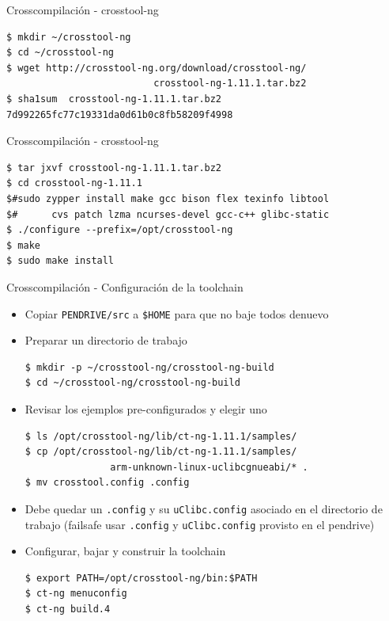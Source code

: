\documentclass[xetex]{beamer}
\begin{document}
\begin{frame}[fragile]{Crosscompilación - crosstool-ng}
\begin{verbatim}
$ mkdir ~/crosstool-ng
$ cd ~/crosstool-ng
$ wget http://crosstool-ng.org/download/crosstool-ng/
                          crosstool-ng-1.11.1.tar.bz2
$ sha1sum  crosstool-ng-1.11.1.tar.bz2 
7d992265fc77c19331da0d61b0c8fb58209f4998 
\end{verbatim}
\end{frame}

\begin{frame}[fragile]{Crosscompilación - crosstool-ng}
\begin{verbatim}
$ tar jxvf crosstool-ng-1.11.1.tar.bz2
$ cd crosstool-ng-1.11.1
$#sudo zypper install make gcc bison flex texinfo libtool
$#      cvs patch lzma ncurses-devel gcc-c++ glibc-static
$ ./configure --prefix=/opt/crosstool-ng
$ make
$ sudo make install
\end{verbatim}
\end{frame}

\begin{frame}[fragile]{Crosscompilación - Configuración de la toolchain}
\begin{itemize}
  \item Copiar \verb=PENDRIVE/src= a \verb=$HOME= para que no baje todos denuevo
  \item Preparar un directorio de trabajo
\begin{verbatim}
$ mkdir -p ~/crosstool-ng/crosstool-ng-build
$ cd ~/crosstool-ng/crosstool-ng-build
\end{verbatim}
  \item Revisar los ejemplos pre-configurados y elegir uno
\begin{verbatim}
$ ls /opt/crosstool-ng/lib/ct-ng-1.11.1/samples/
$ cp /opt/crosstool-ng/lib/ct-ng-1.11.1/samples/
               arm-unknown-linux-uclibcgnueabi/* .
$ mv crosstool.config .config
\end{verbatim}
\item Debe quedar un \verb=.config= y su \verb=uClibc.config= asociado en el directorio de trabajo (failsafe usar \verb=.config= y \verb=uClibc.config= provisto en el pendrive)

  \item Configurar, bajar y construir la toolchain
\begin{verbatim}
$ export PATH=/opt/crosstool-ng/bin:$PATH
$ ct-ng menuconfig
$ ct-ng build.4
\end{verbatim}

\end{itemize}
\end{frame}
\end{document}
